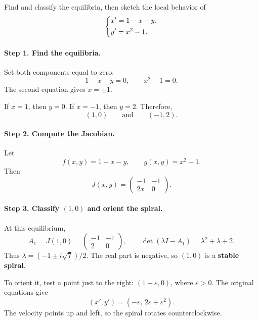 \documentclass[10pt,letterpaper]{article}
\begin{document}
\begin{example}[1]{
Find and classify the equilibria, then sketch the
local behavior of
\[
\begin{dcases}
x'=1-x-y,\\
y'=x^2-1.
\end{dcases}
\]
}

\paragraph{Step 1. Find the equilibria.}
Set both components equal to zero:
\[
1-x-y=0,\qquad x^2-1=0.
\]
The second equation gives $x=\pm1$.

If $x=1$, then $y=0$.
If $x=-1$, then $y=2$.
Therefore,
\[
\boxed{(1,0)\qquad\text{and}\qquad(-1,2).}
\]

\paragraph{Step 2. Compute the Jacobian.}
Let
\[
f(x,y)=1-x-y,\qquad g(x,y)=x^2-1.
\]
Then
\[
\boxed{
J(x,y)=
\begin{pmatrix}
-1&-1\\
2x&0
\end{pmatrix}.
}
\]

\paragraph{Step 3. Classify $(1,0)$ and orient the spiral.}
At this equilibrium,
\[
A_1=J(1,0)=\begin{pmatrix}-1&-1\\2&0\end{pmatrix},
\qquad
\det(\lambda I-A_1)=\lambda^2+\lambda+2.
\]
Thus $\lambda=(-1\pm i\sqrt7)/2$. The real part is negative, so
$(1,0)$ is a \textbf{stable spiral}.

To orient it, test a point just to the right: $(1+\varepsilon,0)$,
where $\varepsilon>0$. The original equations give
\[
(x',y')=(-\varepsilon,\,2\varepsilon+\varepsilon^2).
\]
The velocity points up and left, so the spiral rotates counterclockwise.


\end{example}
\end{document}
